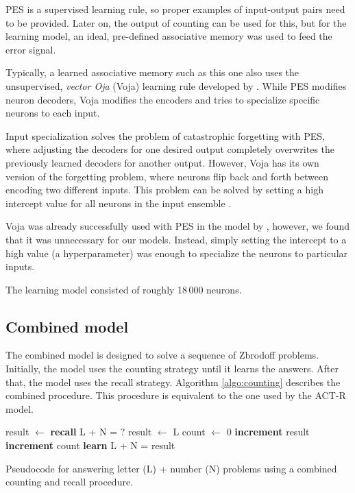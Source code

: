 \documentclass[10pt, a4paper, twocolumn]{article}
\begin{document}
PES is a supervised learning rule, so proper examples of input-output pairs need to be provided. Later on, the output of counting can be used for this, but for the learning model, an ideal, pre-defined associative memory was used to feed the error signal.

Typically, a learned associative memory such as this one also uses the unsupervised, \emph{vector Oja} (Voja) learning rule developed by \cite{Voelker2014}. While PES modifies neuron decoders, Voja modifies the encoders and tries to specialize specific neurons to each input.

Input specialization solves the problem of catastrophic forgetting with PES, where adjusting the decoders for one desired output completely overwrites the previously learned decoders for another output. However, Voja has its own version of the forgetting problem, where neurons flip back and forth between encoding two different inputs. This problem can be solved by setting a high intercept value for all neurons in the input ensemble \citep{Knight2016}.

Voja was already successfully used with PES in the model by \cite{Aubin2016}, however, we found that it was unnecessary for our models. Instead, simply setting the intercept to a high value (a hyperparameter) was enough to specialize the neurons to particular inputs.

The learning model consisted of roughly 18\,000 neurons.

\subsection{Combined model}

The combined model is designed to solve a sequence of Zbrodoff problems. Initially, the model uses the counting strategy until it learns the answers. After that, the model uses the recall strategy. Algorithm \ref{algo:counting} describes the combined procedure. This procedure is equivalent to the one used by the ACT-R model.

\begin{algorithm}[h]
	\begin{algorithmic}
		\State result $\gets$ \textbf{recall} L + N = ?
			\State result $\gets$ L
			\State count $\gets$ 0
				\State \textbf{increment} result
				\State \textbf{increment} count
			\EndWhile
		\EndIf
		\State \textbf{learn} L + N = result
	\end{algorithmic}
	\caption{Pseudocode for answering letter (L) + number (N) problems using a combined counting and recall procedure.}
	\label{algo:combined}
\end{algorithm}
\end{document}
